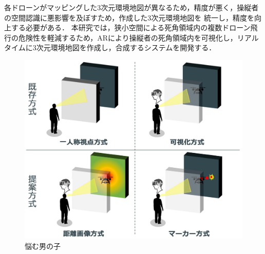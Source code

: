 \documentclass[a4paper,10pt,twocolumn,uplatex]{jsarticle}
\begin{document}
各ドローンがマッピングした3次元環境地図が異なるため，精度が悪く，操縦者の空間認識に悪影響を及ぼすため，作成した3次元環境地図を
統一し，精度を向上する必要がある．
本研究では，狭小空間による死角領域内の複数ドローン飛行の危険性を軽減するため，ARにより操縦者の死角領域内を可視化し，リアルタイムに3次元環境地図を作成し，合成するシステムを開発する．


\begin{figure}[!tb]
  \centering
  \includegraphics[width=\linewidth]{img/03_outline.eps}
  \caption{悩む男の子}
  \label{fig:sample1}
\end{figure}

\end{document}

